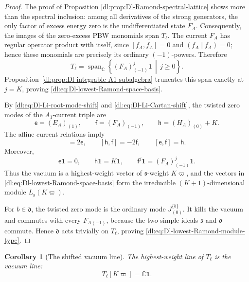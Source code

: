 \documentclass[11pt,reqno]{amsart}
\newtheorem{corollary}[theorem]{Corollary}
\theoremstyle{definition}
\theoremstyle{remark}
\begin{document}
\begin{proof}
The proof of Proposition
\ref{dl:prop:Dl-Ramond-spectral-lattice} shows more than the spectral
inclusion: among all derivatives of the strong generators, the only
factor of excess energy zero is the undifferentiated state \(F_A\).
Consequently, the images of the zero-excess PBW monomials span
\(T_\ell\).  The current $F_A$ has regular operator product with itself,
since $[f_A,f_A]=0$ and $(f_A\mid f_A)=0$; hence these monomials are
precisely its ordinary $(-1)$-powers.  Therefore
\begin{equation*}
  T_\ell
  =
  \operatorname{span}_{\mathbb C}
  \left\{
    (F_A)_{(-1)}^j\mathbf1
    \,\middle|\,
    j\ge0
  \right\}.
\end{equation*}
Proposition~\ref{dl:prop:Dl-integrable-A1-subalgebra} truncates this span
exactly at \(j=K\), proving
\eqref{dl:eq:Dl-lowest-Ramond-space-basis}.

By \eqref{dl:eq:Dl-Li-root-mode-shift} and
\eqref{dl:eq:Dl-Li-Cartan-shift}, the twisted zero modes of the
\(A_1\)-current triple are
\begin{equation*}
  \mathsf e
  =
  (E_A)_{(1)},
  \qquad
  \mathsf f
  =
  (F_A)_{(-1)},
  \qquad
  \mathsf h
  =
  (H_A)_{(0)}+K.
\end{equation*}
The affine current relations imply
\begin{equation*}
  [\mathsf h,\mathsf e]=2\mathsf e,
  \qquad
  [\mathsf h,\mathsf f]=-2\mathsf f,
  \qquad
  [\mathsf e,\mathsf f]=\mathsf h.
\end{equation*}
Moreover,
\begin{equation*}
  \mathsf e\mathbf1=0,
  \qquad
  \mathsf h\mathbf1=K\mathbf1,
  \qquad
  \mathsf f^j\mathbf1
  =
  (F_A)_{(-1)}^j\mathbf1.
\end{equation*}
Thus the vacuum is a highest-weight vector of
\(\mathfrak s\)-weight \(K\varpi\), and the vectors in
\eqref{dl:eq:Dl-lowest-Ramond-space-basis} form the irreducible
\((K+1)\)-dimensional module
\(L_{\mathfrak s}(K\varpi)\).

For \(b\in\mathfrak d\), the twisted zero mode is the ordinary mode
\(J^{\{b\}}_{(0)}\).  It kills the vacuum and commutes with every
\(F_A{}_{(-1)}\), because the two simple ideals
\(\mathfrak s\) and \(\mathfrak d\) commute.  Hence
\(\mathfrak d\) acts trivially on \(T_\ell\), proving
\eqref{dl:eq:Dl-lowest-Ramond-module-type}.
\end{proof}

\begin{corollary}[The shifted vacuum line]
\label{dl:cor:Dl-shifted-vacuum-line}
The highest-weight line of \(T_\ell\) is the vacuum line:
\begin{equation*}
  T_\ell[K\varpi]
  =
  \mathbb C\mathbf1.
\end{equation*}
\end{corollary}
\end{document}
